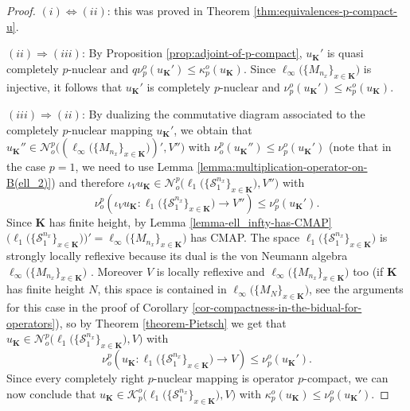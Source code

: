 \documentclass[11pt]{amsart}
\numberwithin{equation}{section}
\begin{document}
\begin{proof} 
$(i) \Leftrightarrow (ii)$: this was proved in
 Theorem \ref{thm:equivalences-p-compact-u}.

 

$(ii) \Rightarrow (iii)$:
By Proposition \ref{prop:adjoint-of-p-compact}, $u_\mathbf{K}'$ is quasi completely $p$-nuclear and $q\nu_p^o(u_\mathbf{K}') \le \kappa_p^o(u_\mathbf{K})$.
Since $\ell_\infty\big( \{M_{n_x}\}_{x \in \mathbf{K}} \big)$ is injective, it follows that $u_\mathbf{K}'$ is completely $p$-nuclear and $\nu_p^o(u_\mathbf{K}') \le \kappa_p^o(u_\mathbf{K})$.

$(iii) \Rightarrow (ii)$:
By dualizing the  commutative diagram associated to the completely $p$-nuclear mapping $u_\mathbf{K}'$, we obtain that $u_\mathbf{K}'' \in \mathcal{N}^p_o\big( (\ell_\infty\big( \{M_{n_x}\}_{x \in \mathbf{K}} \big))',V''\big)$
with $\nu^p_o(u_\mathbf{K}'') \le \nu_p^o(u_\mathbf{K}')$
(note that in the case $p=1$, we need to use Lemma \ref{lemma:multiplication-operator-on-B(ell_2)})
and therefore $\iota_V u_\mathbf{K} \in \mathcal{N}^p_o\big(  \ell_1\big( \{ \mathcal{S}^{n_x}_1 \}_{x \in \mathbf{K}}\big)  , V'' \big)$ with
$$
\nu^p_o(\iota_V u_{\mathbf{K}} : \ell_1\big( \{ \mathcal{S}^{n_x}_1 \}_{x \in \mathbf{K}}\big) \to V'' ) \le \nu_p^o(u_{\mathbf{K}}').
$$
Since $\mathbf{K}$ has finite height, by Lemma \ref{lemma-ell_infty-has-CMAP} $ \big( \ell_1\big( \{ \mathcal{S}^{n_x}_1 \}_{x \in \mathbf{K}}\big) \big)' = \ell_\infty\big( \{ M_{n_x} \}_{x \in \mathbf{K}}\big) $ has CMAP.
The space $\ell_1\big( \{ \mathcal{S}^{n_x}_1 \}_{x \in \mathbf{K}}\big)$ is strongly locally reflexive because its dual is the von Neumann algebra $\ell_\infty\big( \{ M_{n_x} \}_{x \in \mathbf{K}}\big)$ \cite[Thm. 15.3.5]{Effros-Ruan-book}.
Moreover $V$ is locally reflexive  and  $\ell_\infty\big( \{ M_{n_x} \}_{x \in \mathbf{K}}\big)$ too (if $\mathbf{K}$ has finite height $N$, this space is contained in  $\ell_\infty\big( \{ M_{N} \}_{x \in \mathbf{K}}\big)$, see the arguments for this case in the proof of Corollary \ref{cor-compactness-in-the-bidual-for-operators}), so by Theorem \ref{theorem-Pietsch} 
we get that $u_\mathbf{K} \in \mathcal{N}^p_o\big(  \ell_1\big( \{ \mathcal{S}^{n_x}_1 \}_{x \in \mathbf{K}}\big)  , V \big)$ with
$$
\nu^p_o(u_{\mathbf{K}} : \ell_1\big( \{ \mathcal{S}^{n_x}_1 \}_{x \in \mathbf{K}}\big) \to V ) \le \nu_p^o(u_{\mathbf{K}}').
$$
Since every completely right $p$-nuclear mapping is operator $p$-compact, we can now conclude that $u_\mathbf{K} \in \mathcal{K}_p^o\big(  \ell_1\big( \{ \mathcal{S}^{n_x}_1 \}_{x \in \mathbf{K}}\big)  , V \big)$ with $\kappa_p^o(u_{\mathbf{K}}) \le \nu_p^o(u_{\mathbf{K}}')$. 
\end{proof}
\end{document}
